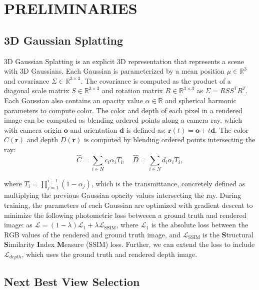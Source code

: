 \documentclass[letterpaper, 10 pt, conference]{ieeeconf}  %
\begin{document}
\section{PRELIMINARIES}
\label{sec:prelim}

\subsection{ 3D Gaussian Splatting}
3D Gaussian Splatting is an explicit 3D representation that represents a scene with 3D Gaussians. Each Gaussian is parameterized by a mean position $\mu \in \mathbb{R}^3$ and covariance $\Sigma \in \mathbb{R}^{3 \times 3}$. The covariance is computed as the product of a diagonal scale matrix $S \in \mathbb{R}^{3 \times 3}$ and rotation matrix $R \in \mathbb{R}^{3 \times 3}$ as $\Sigma = RS S^T R^T$. Each Gaussian also contains an opacity value $\alpha \in \mathbb{R}$ and spherical harmonic parameters to compute color. The color and depth of each pixel in a rendered image can be computed as blending ordered points along a camera ray, which with camera origin $\mathbf{o}$ and orientation $\mathbf{d}$ is defined as:
$\mathbf{r}(t) = \mathbf{o} + t\mathbf{d}$.
The color $C(\mathbf{r})$ and depth $D(\mathbf{r})$ is computed by blending ordered points intersecting the ray:
\begin{equation}
    \hat{C} = \sum_{i \in N} c_i \alpha_i T_i, \quad \hat{D} = \sum_{i \in N} d_i \alpha_i T_i,
\end{equation}

where $T_i = \prod_{j=1}^{i-1} (1 - \alpha_j)$, which is the transmittance, concretely defined as multiplying the previous Gaussian opacity values intersecting the ray. During training, the parameters of each Gaussian are optimized with gradient descent to minimize the following photometric loss betweeen a ground truth and rendered image:
as $\mathcal{L} = (1 - \lambda) \mathcal{L}_1 + \lambda \mathcal{L}_{\text{SSIM}}$, where $\mathcal{L}_1$ is the absolute loss between the RGB values of the rendered and ground truth image, and $\mathcal{L}_{\text{SSIM}}$ is the \textbf{S}tructural \textbf{S}imilarity \textbf{I}ndex \textbf{M}easure (SSIM) loss. Further, we can extend the loss to include $\mathcal{L}_{depth}$, which uses the ground truth and rendered depth image.


\subsection{Next Best View Selection}
\end{document}

